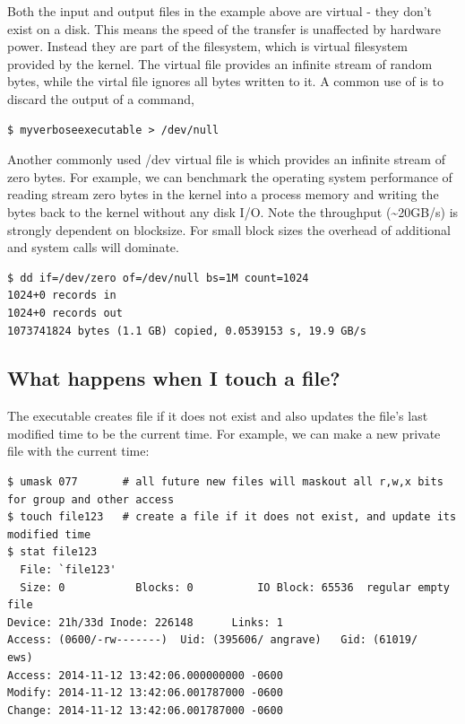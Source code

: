 Both the input and output files in the example above are virtual - they don't exist on a disk. This means the speed of the transfer is unaffected by hardware power. Instead they are part of the  filesystem, which is virtual filesystem provided by the kernel. The virtual file  provides an infinite stream of random bytes, while the virtal file  ignores all bytes written to it. A common use of  is to discard the output of a command,

\begin{lstlisting}
$ myverboseexecutable > /dev/null
\end{lstlisting}

Another commonly used /dev virtual file is  which provides an infinite stream of zero bytes. For example, we can benchmark the operating system performance of reading stream zero bytes in the kernel into a process memory and writing the bytes back to the kernel without any disk I/O. Note the throughput (\textasciitilde{}20GB/s) is strongly dependent on blocksize. For small block sizes the overhead of additional  and  system calls will dominate.

\begin{lstlisting}
$ dd if=/dev/zero of=/dev/null bs=1M count=1024
1024+0 records in
1024+0 records out
1073741824 bytes (1.1 GB) copied, 0.0539153 s, 19.9 GB/s
\end{lstlisting}

\subsection{What happens when I touch a file?}\label{what-happens-when-i-touch-a-file}

The  executable creates file if it does not exist and also updates the file's last modified time to be the current time. For example, we can make a new private file with the current time:

\begin{lstlisting}
$ umask 077       # all future new files will maskout all r,w,x bits for group and other access
$ touch file123   # create a file if it does not exist, and update its modified time
$ stat file123
  File: `file123'
  Size: 0           Blocks: 0          IO Block: 65536  regular empty file
Device: 21h/33d Inode: 226148      Links: 1
Access: (0600/-rw-------)  Uid: (395606/ angrave)   Gid: (61019/     ews)
Access: 2014-11-12 13:42:06.000000000 -0600
Modify: 2014-11-12 13:42:06.001787000 -0600
Change: 2014-11-12 13:42:06.001787000 -0600
\end{lstlisting}

